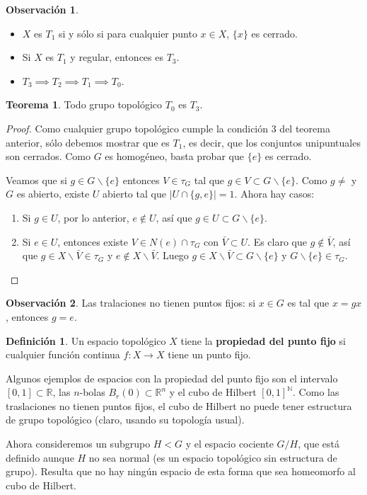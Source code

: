 \documentclass[spanish]{article}
\theoremstyle{definition}
\newtheorem*{defn}{Definición}
\newtheorem*{obs}{Observación}
\newtheorem*{teo}{Teorema}
\newcommand{\R}{\mathbb{R}}
\newcommand{\N}{\mathbb{N}}
\begin{document}
\begin{obs}\leavevmode
	\begin{itemize}
		\item $X$ es $T_1$ si y sólo si para cualquier punto $x\in X$, $\{x\}$ es cerrado.
		\item Si $X$ es $T_1$ y regular, entonces es $T_3$.
		\item $T_3\implies T_2\implies T_1\implies T_0$.
	\end{itemize}
\end{obs}
\begin{teo}
	Todo grupo topológico $T_0$ es $T_3$.
\end{teo}
\begin{proof}
	Como cualquier grupo topológico cumple la condición 3 del teorema anterior, sólo debemos mostrar que es $T_1$, es decir, que los conjuntos unipuntuales son cerrados. Como $G$ es homogéneo, basta probar que $\{e\}$ es cerrado.
	
	Veamos que si $g\in G\backslash\{e\}$ entonces $V\in\tau_G$ tal que $g\in V\subset G\backslash\{e\}$. Como $g\neq $ y $G$ es abierto, existe $U$ abierto tal que $|U\cap\{g,e\}|=1$. Ahora hay casos:
	\begin{enumerate}
		\item Si $g\in U$, por lo anterior, $e\notin U$, así que $g\in U\subset G\backslash\{e\}$.
		\item Si $e\in U$, entonces existe $V\in N(e)\cap\tau_G$ con $\bar{V}\subset U$. Es claro que $g\notin \bar{V}$, así que $g\in X\backslash\bar{V}\in\tau_G$ y $e\notin X\backslash\bar{V}$. Luego $g\in X\backslash\bar{V}\subset G\backslash\{e\}$ y $G\backslash\{e\}\in\tau_G$.
	\end{enumerate}
\end{proof}
\begin{obs}
	Las tralaciones no tienen puntos fijos: si $x\in G$ es tal que $x=gx$, entonces $g=e$.
\end{obs}
\begin{defn}
	Un espacio topológico $X$ tiene la \textbf{propiedad del punto fijo} si cualquier función continua $f:X\to X$ tiene un punto fijo.
\end{defn}
Algunos ejemplos de espacios con la propiedad del punto fijo son el intervalo $[0,1]\subset\R$, las $n$-bolas $B_r(0)\subset\R^n$ y el cubo de Hilbert $[0,1]^\N$. Como las traslaciones no tienen puntos fijos, el cubo de Hilbert no puede tener estructura de grupo topológico (claro, usando su topología usual).

Ahora consideremos un subgrupo $H<G$ y el espacio cociente $G/H$, que está definido aunque $H$ no sea normal (es un espacio topológico sin estructura de grupo). Resulta que no hay ningún espacio de esta forma que sea homeomorfo al cubo de Hilbert.
\end{document}
